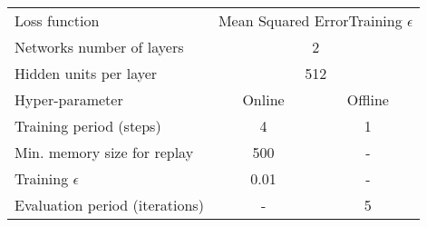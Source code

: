 \begin{table*}[t]
\begin{tabular}{lcc}
Loss function                        & \multicolumn{2}{l}{Mean Squared ErrorTraining $\epsilon$}  \\
Networks number of layers            & \multicolumn{2}{c}{2}                                      \\
Hidden units per layer               & \multicolumn{2}{c}{512}                                    \\
\hline
Hyper-parameter                      & Online & Offline                                           \\
\hline
Training period (steps)              & 4      & 1                                                 \\
Min. memory size for replay          & 500    & -                                                 \\
Training $\epsilon$                  & 0.01   & -                                                 \\
Evaluation period (iterations)       & -      & 5                                                 \\
\bottomrule
\end{tabular}
\end{table*}
